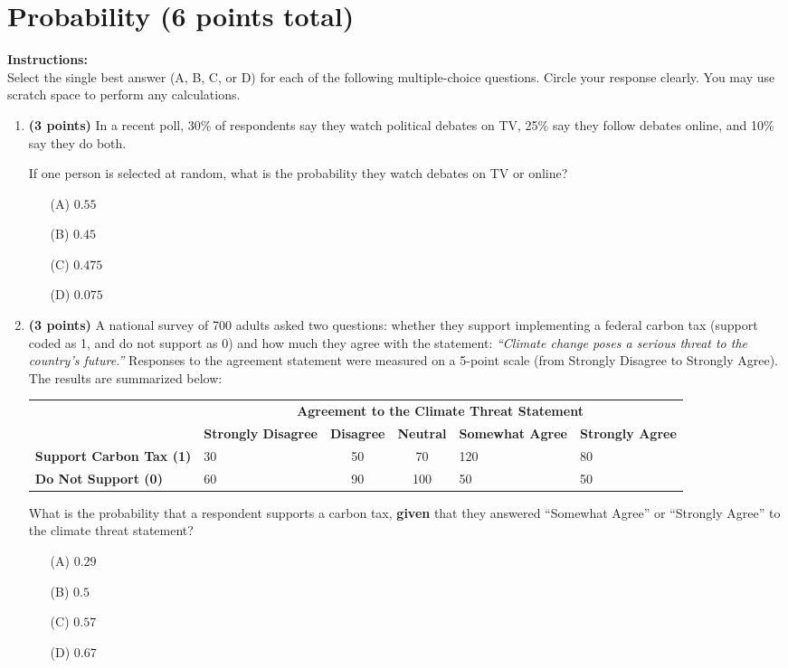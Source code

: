 \documentclass{article}
\newcommand{\blankbox}[2][3cm]{%
    \vspace{-0.5em}
    \begin{figure}[H]
        \makebox[\linewidth]{%
            \begin{tcolorbox}[
                colback=white,
                colframe=white,  %
                width=#2, %
                height=#1,
                boxrule=0.2mm
            ]
            \end{tcolorbox}
        }
    \end{figure}
    \vspace{-2em}
}
\begin{document}
\section{Probability (6 points total)}
\noindent\textbf{Instructions:} \\
Select the single best answer (A, B, C, or D) for each of the following multiple-choice questions. Circle your response clearly. You may use scratch space to perform any calculations.
\begin{enumerate}

\item \textbf{(3 points)} In a recent poll, 30\% of respondents say they watch political debates on TV, 25\% say they follow debates online, and 10\% say they do both.

If one person is selected at random, what is the probability they watch debates on TV or online?
\begin{enumerate}
    \item[(A)] $0.55$
    \item[(B)] $0.45$
    \item[(C)] $0.475$
    \item[(D)] $0.075$
\end{enumerate}  \blankbox[1.5cm]{1.0\linewidth}

\item \textbf{(3 points)}  A national survey of 700 adults asked two questions: whether they support implementing a federal carbon tax (support coded as 1, and do not support as 0) and how much they agree with the statement:
\textit{“Climate change poses a serious threat to the country’s future.”}
Responses to the agreement statement were measured on a 5-point scale (from Strongly Disagree to Strongly Agree). The results are summarized below:

\begin{center}
\begin{tabular}{lp{1.6cm}ccp{1.6cm}p{1.6cm}} \hline
 & \multicolumn{5}{c}{\textbf{Agreement to the Climate Threat Statement}} \\ \cline{2-6}
 & \textbf{Strongly Disagree} & \textbf{Disagree} & \textbf{Neutral} & \textbf{Somewhat Agree} & \textbf{Strongly Agree} \\ \hline
\textbf{Support Carbon Tax (1)}       &  30 &  50 &  70 & 120 &  80 \\
\textbf{Do Not Support (0)} &  60 &  90 & 100 &  50 &  50 \\ \hline
\end{tabular}
\end{center}

What is the probability that a respondent supports a carbon tax, \textbf{given} that they answered “Somewhat Agree” or “Strongly Agree” to the climate threat statement?

\begin{enumerate}
  \item[(A)] $0.29$
  \item[(B)] $0.5$
  \item[(C)] $0.57$
  \item[(D)] $0.67$
\end{enumerate}


\end{enumerate}
\end{document}
